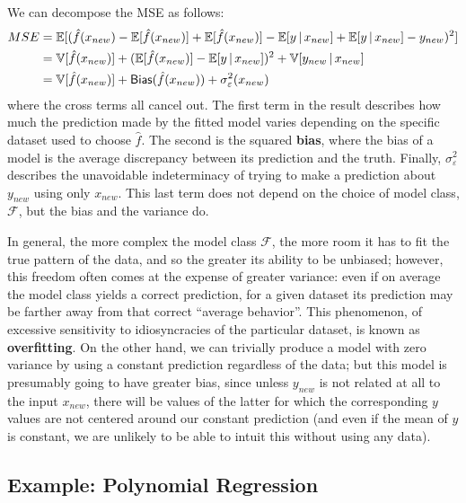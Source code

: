 We can decompose the MSE as follows:
\begin{align*}
  MSE &= \mathbb{E}[(\hat{f}(x_{new}) - \mathbb{E}[\hat{f}(x_{new})] +
      \mathbb{E}[\hat{f}(x_{new})] - \mathbb{E}[y \, \vert \, x_{new}] + \mathbb{E}[y \, \vert \,
        x_{new}] - y_{new})^2]\\
    &= \mathbb{V}[\hat{f}(x_{new})] + (\mathbb{E}[\hat{f}(x_{new})] - \mathbb{E}[y \, \vert \,
      x_{new}])^2 + \mathbb{V}[y_{new} \, \vert \, x_{new}]\\
    &= \mathbb{V}[\hat{f}(x_{new})] + \mathsf{Bias}(\hat{f}(x_{new})) + \sigma^2_{\varepsilon}(x_{new})
\end{align*}
where the cross terms all cancel out.  The first term in the result
describes how much the prediction made by the fitted model varies
depending on the specific dataset used to choose $\hat{f}$.  The
second is the squared {\bf bias}, where the bias of a model is the
average discrepancy between its prediction and the truth.  Finally,
$\sigma^2_{\varepsilon}$ describes the unavoidable indeterminacy of
trying to make a prediction about $y_{new}$ using only $x_{new}$.
This last term does not depend on the choice of model class,
$\mathcal{F}$, but the bias and the variance do.

In general, the more complex the model class $\mathcal{F}$, the more
room it has to fit the true pattern of the data, and so the
greater its ability to be unbiased; however, this freedom often comes
at the expense of greater variance: even if on average the model class
yields a correct prediction, for a given dataset its prediction may be
farther away from that correct ``average behavior''.  This phenomenon,
of excessive sensitivity to idiosyncracies of the particular dataset,
is known as {\bf overfitting}.  On the other hand, we can trivially
produce a model with zero variance by using a constant prediction
regardless of the data; but this model is presumably going to have
greater bias, since unless $y_{new}$ is not related at all to the
input $x_{new}$, there will be values of the latter for which the
corresponding $y$ values are not centered around our constant
prediction (and even if the mean of $y$ is constant, we are unlikely
to be able to intuit this without using any data).

\subsection{Example: Polynomial Regression}
\label{sec:exampl-polyn-regr}

